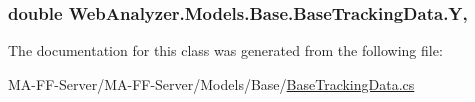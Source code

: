 \subsubsection[{Y}]{\setlength{\rightskip}{0pt plus 5cm}double Web\+Analyzer.\+Models.\+Base.\+Base\+Tracking\+Data.\+Y\hspace{0.3cm}{\ttfamily [get]}, {\ttfamily [set]}}\label{class_web_analyzer_1_1_models_1_1_base_1_1_base_tracking_data_ad885c1d6a4adb3f61a09b49d6e1550e7}


The documentation for this class was generated from the following file\+:\begin{DoxyCompactItemize}
\item 
M\+A-\/\+F\+F-\/\+Server/\+M\+A-\/\+F\+F-\/\+Server/\+Models/\+Base/\hyperlink{_base_tracking_data_8cs}{Base\+Tracking\+Data.\+cs}\end{DoxyCompactItemize}
